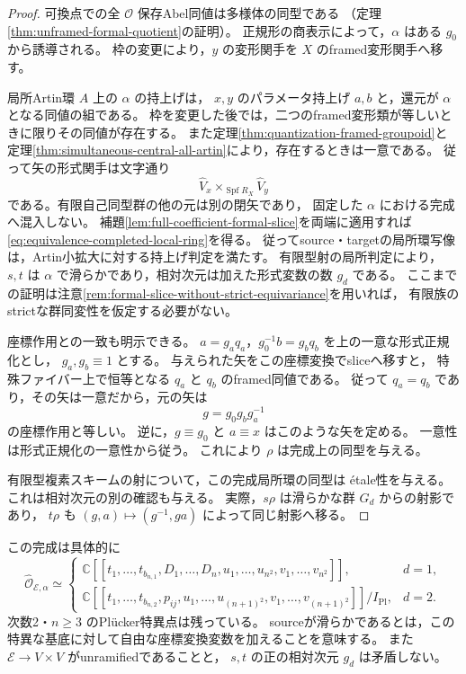 \begin{proof}
可換点での全 $\mathcal O$ 保存Abel同値は多様体の同型である
（定理\ref{thm:unframed-formal-quotient}の証明）。
正規形の商表示によって，$\alpha$ はある $g_0$ から誘導される。
枠の変更により，$y$ の変形関手を $X$ のframed変形関手へ移す。

局所Artin環 $A$ 上の $\alpha$ の持上げは，
$x,y$ のパラメータ持上げ $a,b$ と，還元が $\alpha$ となる同値の組である。
枠を変更した後では，二つのframed変形類が等しいときに限りその同値が存在する。
また定理\ref{thm:quantization-framed-groupoid}と
定理\ref{thm:simultaneous-central-all-artin}により，存在するときは一意である。
従って矢の形式関手は文字通り
\[
 \widehat V_x\times_{\operatorname{Spf}R_X}\widehat V_y
\]
である。有限自己同型群の他の元は別の閉矢であり，
固定した $\alpha$ における完成へ混入しない。
補題\ref{lem:full-coefficient-formal-slice}を両端に適用すれば
\eqref{eq:equivalence-completed-local-ring}を得る。
従ってsource・targetの局所環写像は，Artin小拡大に対する持上げ判定を満たす。
有限型射の局所判定\cite[Lemma~15.39.6, Tag~07VH]{StacksProject}により，
$s,t$ は $\alpha$ で滑らかであり，相対次元は加えた形式変数の数 $g_d$ である。
ここまでの証明は注意\ref{rem:formal-slice-without-strict-equivariance}を用いれば，
有限族のstrictな群同変性を仮定する必要がない。

座標作用との一致も明示できる。
$a=g_aq_a$，$g_0^{-1}b=g_bq_b$ を上の一意な形式正規化とし，
$g_a,g_b\equiv1$ とする。
与えられた矢をこの座標変換でsliceへ移すと，
特殊ファイバー上で恒等となる $q_a$ と $q_b$ のframed同値である。
従って $q_a=q_b$ であり，その矢は一意だから，元の矢は
\[
       g=g_0g_bg_a^{-1}
\]
の座標作用と等しい。
逆に，$g\equiv g_0$ と $a\equiv x$ はこのような矢を定める。
一意性は形式正規化の一意性から従う。
これにより $\rho$ は完成上の同型を与える。

有限型複素スキームの射について，この完成局所環の同型は
\'{e}tale性を与える\cite[Lemma~41.11.3, Tag~039M]{StacksProject}。
これは相対次元の別の確認も与える。
実際，$s\rho$ は滑らかな群 $G_d$ からの射影であり，
$t\rho$ も $(g,a)\mapsto(g^{-1},ga)$ によって同じ射影へ移る。
\end{proof}

\begin{remark}[相対滑らかさと絶対特異点]
この完成は具体的に
\[
 \widehat{\mathcal O}_{\mathcal E,\alpha}\simeq
 \begin{cases}
 \mathbb C[[t_1,\ldots,t_{b_{n,1}},D_1,\ldots,D_n,
                u_1,\ldots,u_{n^2},v_1,\ldots,v_{n^2}]],&d=1,\\[2pt]
 \mathbb C[[t_1,\ldots,t_{b_{n,2}},p_{ij},
                u_1,\ldots,u_{(n+1)^2},v_1,\ldots,v_{(n+1)^2}]]/I_{\mathrm{Pl}},&d=2.
 \end{cases}
\]
次数2・$n\ge3$ のPl\"ucker特異点は残っている。
sourceが滑らかであるとは，この特異な基底に対して自由な座標変換変数を加えることを意味する。
また $\mathcal E\to V\times V$ がunramifiedであることと，
$s,t$ の正の相対次元 $g_d$ は矛盾しない。
\end{remark}

